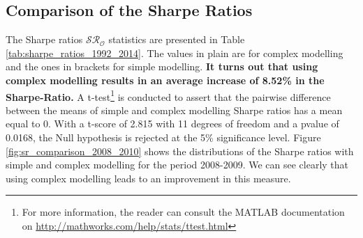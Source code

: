 \documentclass[11pt,a4,twosided,singlespacing,titlepagenumber=on]{scrreprt}
\numberwithin{equation}{chapter} %
\theoremstyle{remark}
\begin{document}
\subsection{Comparison of the Sharpe Ratios}
The Sharpe ratios $\mathcal{SR}_\mathcal{O}$ statistics are presented in Table \ref{tab:sharpe_ratios_1992_2014}. The values in plain are for complex modelling and the ones in brackets for simple modelling. \textbf{It turns out that using complex modelling results in an average increase of 8.52\% in the Sharpe-Ratio.} A t-test\footnote{For more information, the reader can consult the MATLAB documentation on \url{http://mathworks.com/help/stats/ttest.html}} is conducted to assert that the pairwise difference between the means of simple and complex modelling Sharpe ratios has a mean equal to 0. With a t-score of 2.815 with 11 degrees of freedom and a pvalue of 0.0168, the Null hypothesis is rejected at the 5\% significance level. Figure \ref{fig:sr_comparison_2008_2010} shows the distributions of the Sharpe ratios with simple and complex modelling for the period 2008-2009. We can see clearly that using complex modelling leads to an improvement in this measure.
\end{document}
